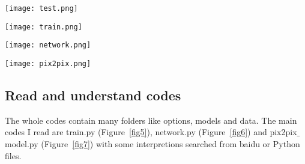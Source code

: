 \documentclass[a4paper]{article}
\begin{document}
\begin{figure*}
\begin{center}
\texttt{[image: test.png]}
\end{center}
\caption{The test result of pix2pix.}
\label{fig4}
\end{figure*}

\begin{figure*}
\begin{center}
\texttt{[image: train.png]}
\end{center}
\caption{Train.}
\label{fig5}
\end{figure*}

\begin{figure*}
\begin{center}
\texttt{[image: network.png]}
\end{center}
\caption{Network.}
\label{fig6}
\end{figure*}

\begin{figure*}
\begin{center}
\texttt{[image: pix2pix.png]}
\end{center}
\caption{Pix2pix$\_$model.}
\label{fig7}
\end{figure*}

\subsection{Read and understand codes}

The whole codes contain many folders like options, models and data. The main codes I read are train.py (Figure~\ref{fig5}), network.py (Figure~\ref{fig6}) and pix2pix$\_$model.py (Figure~\ref{fig7}) with some interpretions searched from baidu or Python files. 









{\small
 
 
 
}
\end{document}
